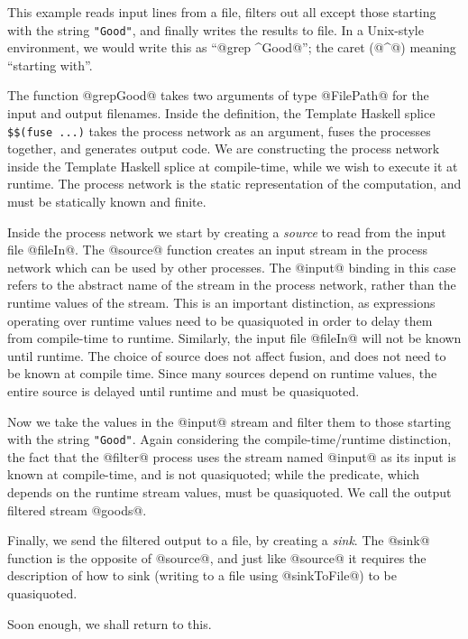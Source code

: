 This example reads input lines from a file, filters out all except those starting with the string \lstinline/"Good"/, and finally writes the results to file.
In a Unix-style environment, we would write this as ``@grep ^Good@''; the caret (@^@) meaning ``starting with''.

The function @grepGood@ takes two arguments of type @FilePath@ for the input and output filenames.
Inside the definition, the Template Haskell splice \lstinline/$$(fuse ...)/ takes the process network as an argument, fuses the processes together, and generates output code.
We are constructing the process network inside the Template Haskell splice at compile-time, while we wish to execute it at runtime.
The process network is the static representation of the computation, and must be statically known and finite.

Inside the process network we start by creating a \emph{source} to read from the input file @fileIn@.
The @source@ function creates an input stream in the process network which can be used by other processes.
The @input@ binding in this case refers to the abstract name of the stream in the process network, rather than the runtime values of the stream.
This is an important distinction, as expressions operating over runtime values need to be quasiquoted in order to delay them from compile-time to runtime.
Similarly, the input file @fileIn@ will not be known until runtime.
The choice of source does not affect fusion, and does not need to be known at compile time.
Since many sources depend on runtime values, the entire source is delayed until runtime and must be quasiquoted.

Now we take the values in the @input@ stream and filter them to those starting with the string \lstinline/"Good"/.
Again considering the compile-time/runtime distinction, the fact that the @filter@ process uses the stream named @input@ as its input is known at compile-time, and is not quasiquoted; while the predicate, which depends on the runtime stream values, must be quasiquoted.
We call the output filtered stream @goods@.

Finally, we send the filtered output to a file, by creating a \emph{sink}.
The @sink@ function is the opposite of @source@, and just like @source@ it requires the description of how to sink (writing to a file using @sinkToFile@) to be quasiquoted.

Soon enough, we shall return to this.


% 
% 

